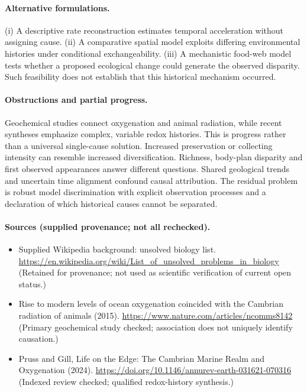 \documentclass[11pt]{article}
\begin{document}
\paragraph{Alternative formulations.} (i) A descriptive rate reconstruction estimates temporal acceleration without assigning cause. (ii) A comparative spatial model exploits differing environmental histories under conditional exchangeability. (iii) A mechanistic food-web model tests whether a proposed ecological change could generate the observed disparity. Such feasibility does not establish that this historical mechanism occurred.

\paragraph{Obstructions and partial progress.} Geochemical studies connect oxygenation and animal radiation, while recent syntheses emphasize complex, variable redox histories. This is progress rather than a universal single-cause solution. Increased preservation or collecting intensity can resemble increased diversification. Richness, body-plan disparity and first observed appearances answer different questions. Shared geological trends and uncertain time alignment confound causal attribution. The residual problem is robust model discrimination with explicit observation processes and a declaration of which historical causes cannot be separated.

\paragraph{Sources (supplied provenance; not all rechecked).} \begin{itemize}
\item Supplied Wikipedia background: unsolved biology list. \url{https://en.wikipedia.org/wiki/List_of_unsolved_problems_in_biology} (Retained for provenance; not used as scientific verification of current open status.)
\item Rise to modern levels of ocean oxygenation coincided with the Cambrian radiation of animals (2015). \url{https://www.nature.com/articles/ncomms8142} (Primary geochemical study checked; association does not uniquely identify causation.)
\item Pruss and Gill, Life on the Edge: The Cambrian Marine Realm and Oxygenation (2024). \url{https://doi.org/10.1146/annurev-earth-031621-070316} (Indexed review checked; qualified redox-history synthesis.)
\end{itemize}
\end{document}
